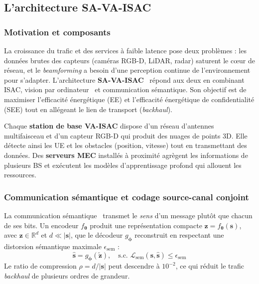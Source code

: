 \documentclass[12pt,a4paper,titlepage]{article}
\begin{document}
\subsection{L'architecture SA-VA-ISAC}
\label{subsec:sa_va_isac}

\subsubsection{Motivation et composants}

La croissance du trafic et des services à faible latence pose deux problèmes : les données brutes des capteurs (caméras RGB-D, LiDAR, radar) saturent le c\oe ur de réseau, et le \textit{beamforming} a besoin d'une perception continue de l'environnement pour s'adapter. L'architecture \textbf{SA-VA-ISAC}~\cite{sa_va_isac_main} répond aux deux en combinant ISAC, vision par ordinateur~\cite{vision_isac} et communication sémantique. Son objectif est de maximiser l'efficacité énergétique (EE) et l'efficacité énergétique de confidentialité (SEE) tout en allégeant le lien de transport (\textit{backhaul}).

Chaque \textbf{station de base VA-ISAC} dispose d'un réseau d'antennes multifaisceau et d'un capteur RGB-D qui produit des nuages de points 3D. Elle détecte ainsi les UE et les obstacles (position, vitesse) tout en transmettant des données. Des \textbf{serveurs MEC} installés à proximité agrègent les informations de plusieurs BS et exécutent les modèles d'apprentissage profond qui allouent les ressources.

\subsubsection{Communication sémantique et codage source-canal conjoint}

La communication sémantique~\cite{semantic_comm} transmet le \textit{sens} d'un message plutôt que chacun de ses bits. Un encodeur $f_{\boldsymbol{\theta}}$ produit une représentation compacte $\mathbf{z} = f_{\boldsymbol{\theta}}(\mathbf{s})$, avec $\mathbf{z} \in \mathbb{R}^d$ et $d \ll |\mathbf{s}|$, que le décodeur $g_{\boldsymbol{\phi}}$ reconstruit en respectant une distorsion sémantique maximale $\epsilon_{\mathrm{sem}}$ :
\begin{equation}
    \hat{\mathbf{s}} = g_{\boldsymbol{\phi}}(\tilde{\mathbf{z}}), \quad \text{s.c. } \mathcal{L}_{\mathrm{sem}}(\mathbf{s}, \hat{\mathbf{s}}) \leq \epsilon_{\mathrm{sem}}
    \label{eq:semantic_decoder}
\end{equation}
Le ratio de compression $\rho = d/|\mathbf{s}|$ peut descendre à $10^{-2}$, ce qui réduit le trafic \textit{backhaul} de plusieurs ordres de grandeur.
\end{document}
